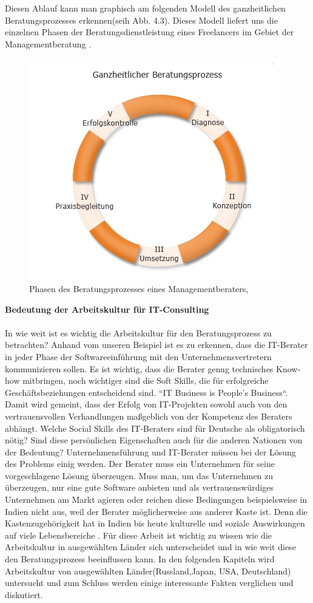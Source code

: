 	Diesen Ablauf kann man graphisch am folgenden Modell des ganzheitlichen Beratungsprozesses erkennen(seih Abb. 4.3). Dieses Modell liefert uns die einzelnen Phasen der Beratungsdienstleistung eines Freelancers im Gebiet der Managementberatung \cite{MngmBerPhasen}.
\begin{figure}[htp]
\centering
\includegraphics[width=0.7\linewidth]{./images/beratungsproz}
\caption{Phasen des Beratungsprozesses  eines Managementberaters, \cite{PhasenBeratungsprozess} }
\label{fig:beratungsproz}
\end{figure}
	
	\textbf{ Bedeutung der Arbeitskultur für IT-Consulting}\\ \\
	In wie weit ist es wichtig die Arbeitskultur für den Beratungsprozess zu betrachten? Anhand vom unseren Beispiel ist es zu erkennen, dass die IT-Berater in jeder Phase der Softwareeinführung mit den Unternehmensvertretern kommunizieren sollen. Es ist wichtig, dass die Berater genug technisches Know-how mitbringen, noch wichtiger sind die Soft Skills, die für erfolgreiche Geschäftsbeziehungen entscheidend sind. ``IT Business is People's Business``. Damit wird gemeint, dass der Erfolg von   IT-Projekten sowohl auch von den vertrauensvollen Verhandlungen maßgeblich von der Kompetenz des Beraters abhängt. \cite{ITConsRu}
	Welche Social Skills des IT-Beraters sind für Deutsche als obligatorisch nötig? Sind diese persönlichen Eigenschaften auch für die anderen Nationen von der Bedeutung? Unternehmensführung und IT-Berater müssen bei der Lösung des Problems einig werden. Der Berater muss ein Unternehmen für seine vorgeschlagene Lösung überzeugen. Muss man, um das Unternehmen zu überzeugen, nur eine gute Software anbieten und als vertrauenswürdiges Unternehmen am Markt agieren oder reichen diese Bedingungen beispielsweise in Indien nicht aus, weil der Berater möglicherweise aus anderer Kaste ist. Denn die Kastenzugehörigkeit hat in Indien bis heute kulturelle und soziale Auswirkungen auf viele Lebensbereiche \cite{KastensystemInd}.
	Für diese Arbeit ist wichtig zu wissen wie die Arbeitskultur in ausgewählten Länder sich unterscheidet und in wie weit diese den Beratungsprozess beeinflussen kann.
	In den folgenden Kapiteln wird Arbeitskultur von ausgewählten Länder(Russland,Japan, USA, Deutschland) untersucht und zum Schluss werden einige interessante Fakten verglichen und diskutiert. 

